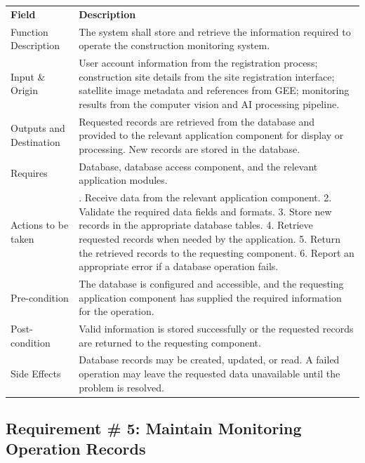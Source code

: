 \documentclass[12pt,a4paper]{report}
\begin{document}
\begin{longtable}[]{@{}
  >{\raggedright\arraybackslash}p{}
  >{\raggedright\arraybackslash}p{}@{}}
\toprule\noalign{}
\endhead
\bottomrule\noalign{}
\endlastfoot
\textbf{Field} & \textbf{Description} \\
Function Description & The system shall store and retrieve the
information required to operate the construction monitoring system. \\
Input \& Origin & User account information from the registration
process; construction site details from the site registration interface;
satellite image metadata and references from GEE; monitoring results
from the computer vision and AI processing pipeline. \\
Outputs and Destination & Requested records are retrieved from the
database and provided to the relevant application component for display
or processing. New records are stored in the database. \\
Requires & Database, database access component, and the relevant
application modules. \\
Actions to be taken & 1. Receive data from the relevant application
component. 2. Validate the required data fields and formats. 3. Store
new records in the appropriate database tables. 4. Retrieve requested
records when needed by the application. 5. Return the retrieved records
to the requesting component. 6. Report an appropriate error if a
database operation fails. \\
Pre-condition & The database is configured and accessible, and the
requesting application component has supplied the required information
for the operation. \\
Post-condition & Valid information is stored successfully or the
requested records are returned to the requesting component. \\
Side Effects & Database records may be created, updated, or read. A
failed operation may leave the requested data unavailable until the
problem is resolved. \\
\end{longtable}

\subsection{Requirement \# 5: Maintain Monitoring Operation
Records}\label{requirement-5-maintain-monitoring-operation-records}
\end{document}
